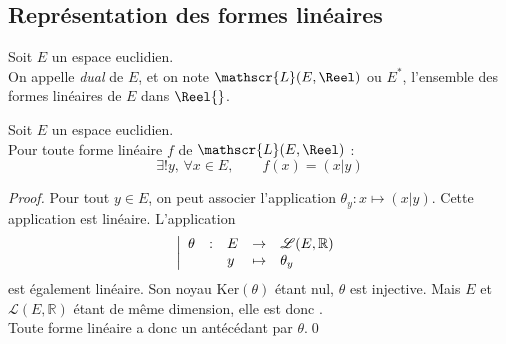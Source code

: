 \documentclass[11pt,a4paper,fleqn,pdftex]{report}
\begin{document}
\subsection{Représentation des formes linéaires} %
\label{sub:representation_des_formes_lineaires}
\begin{dfn} %
     Soit $E$ un espace euclidien. \\
     On appelle \emph{dual} de $E$, et on note $\mathscr{L}(E,\Reel )$ ou $E^*$, l'ensemble des formes linéaires de $E$ dans $\Reel{}$.
\end{dfn}
\begin{theorem}
     Soit $E$ un espace euclidien.\\
     Pour toute forme linéaire $f$ de $\mathscr{L}(E,\Reel )$ : 
     \begin{equation}
     \exists ! y,\, \forall x\in E,\qquad f(x) = (x|y)
     \end{equation}
\end{theorem}
\begin{proof}
     Pour tout $y \in E$, on peut associer l'application $\theta_y : x\mapsto (x|y)$. Cette application est linéaire. L'application \[ \left| \begin{array}{r c l c l} \theta &:& E &\to & \mathscr{L}(E,\mathbb{R})\\ && y &\mapsto& \theta_y \end{array}\right.\] est également linéaire. Son noyau $\mathrm{Ker}(\theta )$ étant nul, $\theta$ est injective. Mais $E$ et $\mathscr{L}(E,\mathbb{R})$ étant de même dimension, elle est donc .\\
     Toute forme linéaire a donc un antécédant par $\theta$.\qed
\end{proof}
\end{document}

